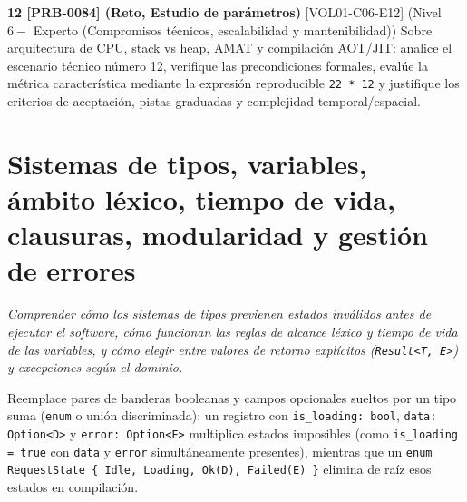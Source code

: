 \documentclass{book}
\begin{document}
\begin{tcolorbox}[title={Ejercicios}, studiumworked, breakable]
\noindent\textbf{12 [PRB-0084] (Reto, Estudio de parámetros)}
[VOL01-C06-E12] (Nivel \(6 -\) Experto (Compromisos técnicos, escalabilidad y mantenibilidad)) Sobre arquitectura de CPU, stack vs heap, AMAT y compilación AOT/JIT: analice el escenario técnico número 12, verifique las precondiciones formales, evalúe la métrica característica mediante la expresión reproducible \texttt{22 * 12} y justifique los criterios de aceptación, pistas graduadas y complejidad temporal/espacial.
\end{tcolorbox}

\chapter{Sistemas de tipos, variables, ámbito léxico, tiempo de vida, clausuras, modularidad y gestión de errores}
\label{chap:cap07-sistemas-de-tipos-control-ambito-errores}

\noindent\textit{Comprender cómo los sistemas de tipos previenen estados inválidos antes de ejecutar el software, cómo funcionan las reglas de alcance léxico y tiempo de vida de las variables, y cómo elegir entre valores de retorno explícitos (\texttt{Result<T, E>}) y excepciones según el dominio.}

\begin{tcolorbox}[title={Consejo}, studiumtip, breakable]

Reemplace pares de banderas booleanas y campos opcionales sueltos por un tipo suma (\texttt{enum} o unión discriminada): un registro con \texttt{is\_loading: bool}, \texttt{data: Option<D>} y \texttt{error: Option<E>} multiplica estados imposibles (como \texttt{is\_loading = true} con \texttt{data} y \texttt{error} simultáneamente presentes), mientras que un \texttt{enum RequestState \{ Idle, Loading, Ok(D), Failed(E) \}} elimina de raíz esos estados en compilación.
\end{tcolorbox}
\end{document}
